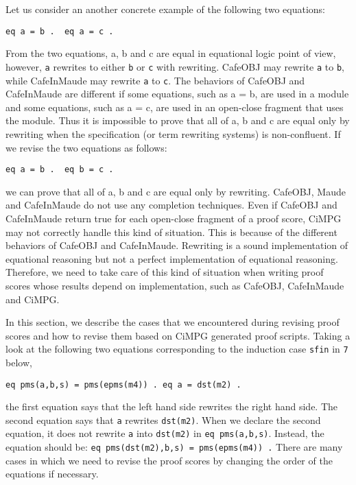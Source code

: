 \documentclass[a4paper,fleqn]{cas-dc}
\begin{document}
Let us consider an another concrete example of the following two equations:
\begin{small}
\begin{verbatim}
eq a = b .  eq a = c .
\end{verbatim}
\end{small}
From the two equations, a, b and c are equal in equational logic point of view, however, \verb!a! rewrites to either \verb!b! or \verb!c! with rewriting.
CafeOBJ may rewrite \verb!a! to \verb!b!, while CafeInMaude may rewrite \verb!a! to \verb!c!. The behaviors of CafeOBJ and CafeInMaude are different if some
equations, such as a = b, are used in a module and some equations, such as a = c, are used in an open-close fragment that uses the module. Thus it is impossible to prove that all of a, b and c are equal only by rewriting when the specification (or term rewriting systems) is non-confluent.
If we revise the two equations as follows:
\begin{small}
\begin{verbatim}
eq a = b .  eq b = c .
\end{verbatim}
\end{small}
we can prove that all of a, b and c are equal only by rewriting. CafeOBJ, Maude and CafeInMaude do not use any completion techniques. Even if CafeOBJ and CafeInMaude return true for each open-close fragment of a proof
score, CiMPG may not correctly handle this kind of situation. This is because of the different behaviors of CafeOBJ and CafeInMaude. Rewriting is a sound implementation of equational reasoning but not a perfect implementation of equational reasoning. Therefore, we need to take care of this kind of situation when writing proof scores whose results depend on implementation, such as CafeOBJ, CafeInMaude and CiMPG.

In this section, we describe the cases that we encountered during revising proof scores and how to revise them based on CiMPG generated proof scripts. Taking a look at the following two equations corresponding to the induction case \verb!sfin! in \verb!7! below,
\begin{small}
\begin{verbatim}
eq pms(a,b,s) = pms(epms(m4)) . eq a = dst(m2) .
\end{verbatim}
\end{small}
the first equation says that the left hand side rewrites the right hand side. The second equation says that \verb!a! rewrites \verb!dst(m2)!. When we declare the second equation, it does not rewrite \verb!a! into \verb!dst(m2)! in \verb!eq pms(a,b,s)!. Instead, the equation should be: \verb!eq pms(dst(m2),b,s) = pms(epms(m4)) .! There are many cases in which we need to revise the proof scores by changing the order of the equations if necessary.
\end{document}
